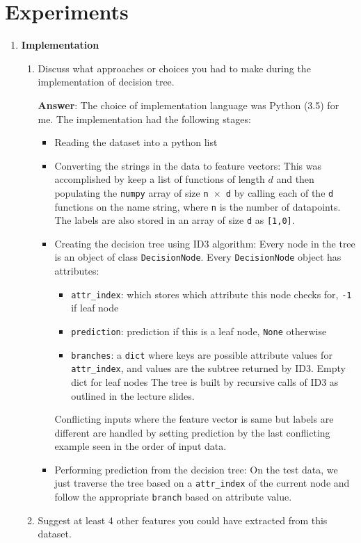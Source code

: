 \documentclass{article}
\begin{document}
\section{Experiments}
\begin{enumerate}
    \item \textbf{Implementation}
    \begin{enumerate}
        \item Discuss what approaches or choices you had to make during the implementation of decision tree.
        
        \textbf{Answer}: The choice of implementation language was Python (3.5) for me. The implementation had the following stages:
        \begin{itemize}
            \item Reading the dataset into a python list
            \item Converting the strings in the data to feature vectors: This was accomplished by keep a list of functions of length $d$ and then populating the \texttt{numpy} array of size \texttt{n $\times$ d} by calling each of the \texttt{d} functions on the name string, where \texttt{n} is the number of datapoints. The labels are also stored in an array of size \texttt{d} as \texttt{[1,0]}.
            \item Creating the decision tree using \textsc{ID3} algorithm: Every node in the tree is an object of class \texttt{DecisionNode}. Every \texttt{DecisionNode} object has attributes: 
            \begin{itemize}
                \item \texttt{attr\_index}: which stores which attribute this node checks for, \texttt{-1} if leaf node
                \item \texttt{prediction}: prediction if this is a leaf node, \texttt{None} otherwise
                \item \texttt{branches}: a \texttt{dict} where keys are possible attribute values for \texttt{attr\_index}, and values are the subtree returned by \textsc{ID3}. Empty dict for leaf nodes
                The tree is built by recursive calls of \textsc{ID3} as outlined in the lecture slides.
            \end{itemize}
            Conflicting inputs where the feature vector is same but labels are different are handled by setting prediction by the last conflicting example seen in the order of input data.
            \item Performing prediction from the decision tree: On the test data, we just traverse the tree based on a \texttt{attr\_index} of the current node and follow the appropriate \texttt{branch} based on attribute value. 
        \end{itemize}
        \item Suggest at least 4 other features you could have extracted from this dataset.
        

\end{enumerate}
\end{enumerate}
\end{document}
